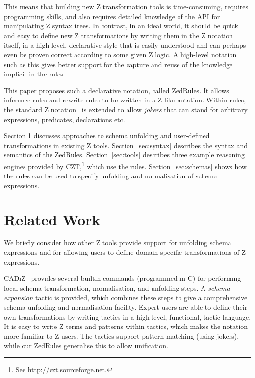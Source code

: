 \documentclass{entcs}
\begin{document}
This means that building new Z transformation tools is time-consuming,
requires programming skills, and also requires detailed knowledge of the
API for manipulating Z syntax trees.  In contrast, in an ideal world, it
should be quick and easy to define new Z transformations by writing them in
the Z notation itself, in a high-level, declarative style that is easily
understood and can perhaps even be proven correct according to some given Z
logic.  A high-level notation such as this gives better support for the
capture and reuse of the knowledge implicit in the
rules~\cite{armour:business-model00}.

This paper proposes such a declarative notation, called ZedRules.  It
allows inference rules and rewrite rules to be written in a Z-like
notation.  Within rules, the standard Z notation~\cite{ISOZ} is extended to
allow \emph{jokers} that can stand for arbitrary expressions, predicates,
declarations etc.

Section \ref{sec:relwork} discusses approaches to schema unfolding and
user-defined transformations in existing Z tools.
Section~\ref{sec:syntax} describes the syntax and semantics of the
ZedRules.  Section~\ref{sec:tools} describes three example reasoning
engines provided by CZT,\footnote{See
\url{http://czt.sourceforge.net}.} which use the rules.
Section~\ref{sec:schemas} shows how the rules can be used to specify
unfolding and normalisation of schema expressions.


\section{Related Work} \label{sec:relwork}

We briefly consider how other Z tools provide support for unfolding
schema expressions and for allowing users to define domain-specific
transformations of Z expressions.

CADiZ~\cite{cadiz:refman02} provides several builtin commands (programmed
in C) for performing local schema transformation, normalisation, and
unfolding steps.  A \emph{schema expansion} tactic is provided, which
combines these steps to give a comprehensive schema unfolding and
normalisation facility.  Expert users are able to define their own
transformations by writing tactics in a high-level, functional, tactic
language.  It is easy to write Z terms and patterns within tactics, which
makes the notation more familiar to Z users.  The tactics support pattern
matching (using jokers), while our ZedRules generalise this to allow
unification.
\end{document}
